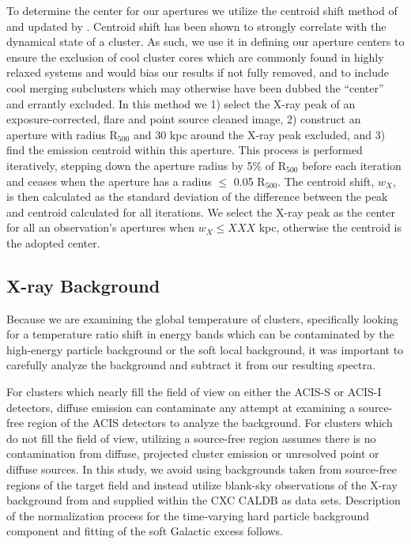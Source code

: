 \documentclass{emulateapj}
\begin{document}
To determine the center for our apertures we utilize the centroid shift
method of \cite{2006ApJ...639...64O} and updated by
\cite{2006MNRAS.373..881P}. Centroid shift has been shown to strongly correlate
with the dynamical state of a cluster. As such, we use it in
defining our aperture centers to ensure the exclusion of cool
cluster cores which are commonly found in highly relaxed systems and
would bias our results if not fully removed, and to include cool
merging subclusters which may otherwise have been dubbed the
``center'' and errantly excluded. In this method we 1) select the X-ray peak
of an exposure-corrected, flare and point source cleaned image, 2) construct an
aperture with radius R$_{500}$ and 30 kpc around the X-ray peak
excluded, and 3) find the emission centroid within this aperture. This
process is performed iteratively, stepping down the aperture radius by
5\% of R$_{500}$ before each iteration and ceases when the aperture
has a radius $\leq$ 0.05 R$_{500}$. The centroid shift, $w_X$, is then calculated as
the standard deviation of the difference between the peak and centroid
calculated for all iterations. We select the X-ray peak as the center
for all an observation's apertures when $w_X \leq XXX$ kpc, otherwise
the centroid is the adopted center.

\subsection{X-ray Background} \label{sec:background}

Because we are examining the global temperature of clusters,
specifically looking for a temperature ratio shift in energy bands
which can be contaminated by the high-energy particle
background or the soft local background, it was important to carefully
analyze the background and subtract it from our resulting spectra.

For clusters which nearly fill the field of view on
either the ACIS-S or ACIS-I detectors, diffuse emission can contaminate
any attempt at examining a source-free region of the ACIS detectors to
analyze the background. For
clusters which do not fill the field of view, utilizing a source-free
region assumes there is no contamination from diffuse, projected
cluster emission or unresolved point or diffuse sources. In this study, we avoid
using backgrounds taken from source-free regions of the target field and
instead utilize blank-sky observations of the X-ray background from
\cite{2001ApJ...562L.153M} and supplied within the CXC CALDB as
data sets. Description of the normalization process for the
time-varying hard particle background component and fitting of the
soft Galactic excess follows.
\end{document}
